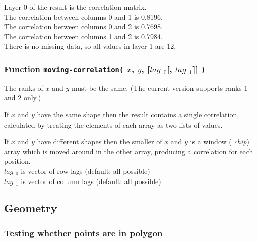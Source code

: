 Layer 0 of the result is the correlation matrix.
  \\The correlation between columns 0 and 1 is 0.8196.
  \\The correlation between columns 0 and 2 is 0.7698.
  \\The correlation between columns 1 and 2 is 0.7984.
  \\There is no missing data, so all values in layer 1 are 12.
  \subsubsection{
    \label{moving-correlation}Function \texttt{moving-correlation(} $x$, $y$, [$lag$ $_{0}$[, $lag$ $_{1}$]] \texttt{)}
  }

  \par The ranks of 
  $x$ and 
  $y$ must be the same. (The current version supports ranks 1
  and 2 only.)
  \par If 
  $x$ and 
  $y$ have the same shape then the result contains a single
  correlation, calculated by treating the elements of each array as two
  lists of values.
  \par If 
  $x$ and 
  $y$ have different shapes then the smaller of 
  $x$ and 
  $y$ is a window ( 
  \textit{chip}) array which is moved around in the other array,
  producing a correlation for each position.
  \\
  $lag$ 
  $_{0}$ is vector of row lags (default: all possible)
  \\
  $lag$ 
  $_{1}$ is vector of column lags (default: all possible)
  \subsection{
    \label{Geometry}Geometry
  }

  \subsubsection{
    \label{inPolygon}Testing whether points are in polygon
  }

